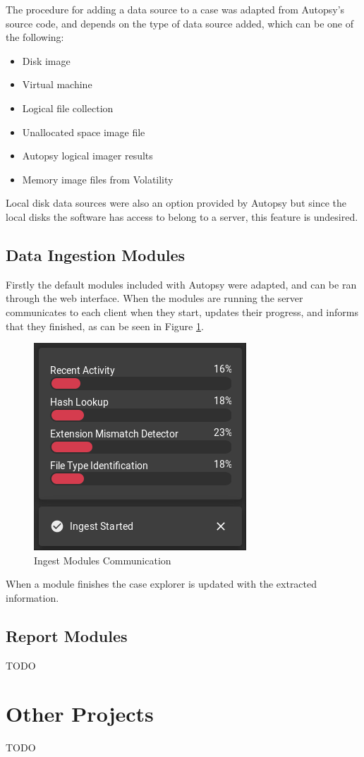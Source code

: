 The procedure for adding a data source to a case was adapted from Autopsy's source code, and depends on the type of data source added, which can be one of the following:
\begin{itemize}
 \item Disk image
 \item Virtual machine
 \item Logical file collection
 \item Unallocated space image file
 \item Autopsy logical imager results
 \item Memory image files from Volatility
\end{itemize}

Local disk data sources were also an option provided by Autopsy but since the local disks the software has access to belong to a server, this feature is undesired.

\subsection{Data Ingestion Modules}

Firstly the default modules included with Autopsy were adapted, and can be ran through the web interface. When the modules are running the server communicates to each client when
they start, updates their progress, and informs that they finished, as can be seen in Figure \ref{fig:modules}.

\begin{figure}[h]
 \centering
 \includegraphics[width=0.5\linewidth]{imgs/modules.png}
 \caption{Ingest Modules Communication}
 \label{fig:modules}
\end{figure}

When a module finishes the case explorer is updated with the extracted information.

\subsection{Report Modules}

TODO

\section{Other Projects}

TODO
